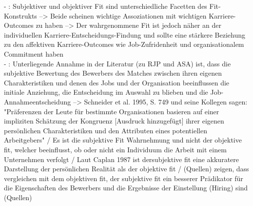 - \cite[S. 8f.]{su:2015}: Subjektiver und objektiver Fit sind unterschiedliche Facetten des Fit-Konstrukts --> Beide scheinen wichtige Assoziationen mit wichtigen Karriere-Outcomes zu haben --> Der wahrgenommene Fit ist jedoch näher an der individuellen Karriere-Entscheidungs-Findung und sollte eine stärkere Beziehung zu den affektiven Karriere-Outcomes wie Job-Zufridenheit und organisationalem Commitment haben \\
- \cite[S. 3]{carless:2005}: Unterliegende Annahme in der Literatur (zu RJP und ASA) ist, dass die subjektive Bewertung des Bewerbers des Matches zwischen ihren eigenen Charakteristiken und denen des Jobs und der Organisation beeinflussen die initiale Anziehung, die Entscheidung im Auswahl zu blieben und die Job-Annahmeentscheidung --> Schneider et al. 1995, S. 749 und seine Kollegen sagen: "Präferenzen der Leute für bestimmte Organisationen basieren auf einer impliziten Schätzung der Kongruenz [Ausdruck hinzugefügt] ihrer eigenen persönlichen Charakteristiken und den Attributen eines potentiellen Arbeitgebers" / Es ist die subjektive Fit Wahrnehmung und nicht der objektive fit, welcher beeinflusst, ob oder nicht ein Individuum die Arbeit mit einem Unternehmen verfolgt / Laut Caplan 1987 ist dersubjektive fit eine akkuratere Darstellung der persönlichen Realität als der objektive fit / (Quellen) zeigen, dass vergleichen mit dem objektiven fit, der subjektive fit ein besserer Prädikator für die Eigenschaften des Bewerbers und die Ergebnisse der Einstellung (Hiring) sind (Quellen) \\


